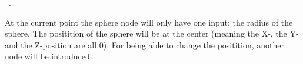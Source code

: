 \documentclass[
    a4paper,      %
    10pt,         %
    openright,    %
    notitlepage,  %
    parskip=half, %
]{scrreprt}       %
\theoremstyle{definition}                    %
\begin{document}
\begin{flushleft}
\begin{minipage}{\linewidth}
\begin{list}{}{}
\mbox{}\lstinline@        @\hbox{$\langle\,${\itshape Implicit sphere node nodes}\nobreak\ {\footnotesize ?}$\,\rangle$}\lstinline@@\\
\mbox{}\lstinline@    ],@\\
\mbox{}\lstinline@    "connections": [@\\
\mbox{}\lstinline@        @\hbox{$\langle\,${\itshape Implicit sphere node connections}\nobreak\ {\footnotesize {}}$\,\rangle$}\lstinline@@\\
\mbox{}\lstinline@    ]@\\
\mbox{}\lstinline@}@{\NWsep}
\end{list}
\vspace{-1.5ex}
\footnotesize
\begin{list}{}{\setlength{\itemsep}{-\parsep}\setlength{\itemindent}{-\leftmargin}}
\item \NWtxtMacroRefIn\ .

\item{}
\end{list}
\end{minipage}\vspace{4ex}
\end{flushleft}
At the current point the sphere node will only have one input: the radius of
the sphere. The positition of the sphere will be at the center (meaning the
X-, the Y- and the Z-position are all 0). For being able to change the
positition, another node will be introduced.
\end{document}

